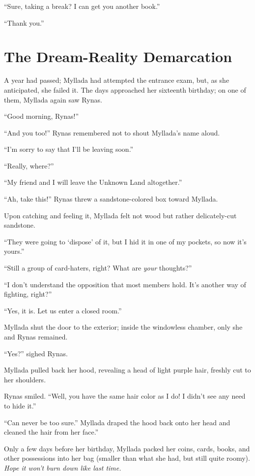 ``Sure, taking a break? I can get you another book.''

``Thank you.''

\chapter{The Dream-Reality Demarcation}

A year had passed; Myllada had attempted the entrance exam, but, as she anticipated, she failed it. The days approached her sixteenth birthday; on one of them, Myllada again saw Rynas.

``Good morning, Rynas!''

``And you too!'' Rynas remembered not to shout Myllada's name aloud.

``I'm sorry to say that I'll be leaving soon.''

``Really, where?''

``My friend and I will leave the Unknown Land altogether.''

``Ah, take this!'' Rynas threw a sandstone-colored box toward Myllada.

Upon catching and feeling it, Myllada felt not wood but rather delicately-cut sandstone.

``They were going to `dispose' of it, but I hid it in one of my pockets, so now it's yours.''

``Still a group of card-haters, right? What are \emph{your} thoughts?''

``I don't understand the opposition that most members hold. It's another way of fighting, right?''

``Yes, it is. Let us enter a closed room.''

\centeredstars

Myllada shut the door to the exterior; inside the windowless chamber, only she and Rynas remained.

``Yes?'' sighed Rynas.

Myllada pulled back her hood, revealing a head of light purple hair, freshly cut to her shoulders.

Rynas smiled. ``Well, you have the same hair color as I do! I didn't see any need to hide it.''

``Can never be too sure.'' Myllada draped the hood back onto her head and cleaned the hair from her face.''

\centeredstars

Only a few days before her birthday, Myllada packed her coins, cards, books, and other possessions into her bag (smaller than what she had, but still quite roomy). \emph{Hope it won't burn down like last time.}

